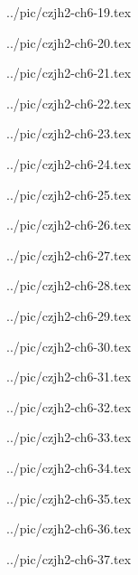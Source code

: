 

../pic/czjh2-ch6-19.tex



../pic/czjh2-ch6-20.tex



../pic/czjh2-ch6-21.tex



../pic/czjh2-ch6-22.tex



../pic/czjh2-ch6-23.tex



../pic/czjh2-ch6-24.tex



../pic/czjh2-ch6-25.tex



../pic/czjh2-ch6-26.tex



../pic/czjh2-ch6-27.tex



../pic/czjh2-ch6-28.tex



../pic/czjh2-ch6-29.tex



../pic/czjh2-ch6-30.tex



../pic/czjh2-ch6-31.tex



../pic/czjh2-ch6-32.tex



../pic/czjh2-ch6-33.tex



../pic/czjh2-ch6-34.tex



../pic/czjh2-ch6-35.tex



../pic/czjh2-ch6-36.tex



../pic/czjh2-ch6-37.tex

